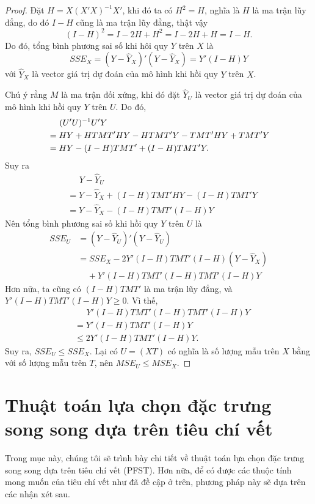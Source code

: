 \begin{proof}
	Đặt $H = X(X'X)^{-1}X'$, khi đó ta có $H^2 = H$, nghĩa là $H$ là ma trận lũy đẳng, do đó $I-H$ cũng là ma trận lũy đẳng, thật vậy
	\begin{equation*}
		(I-H)^2 = I - 2H + H^2 = I - 2H + H = I-H.
	\end{equation*}
	Do đó, tổng bình phương sai số khi hôi quy $Y$ trên $X$ là
	\begin{equation*}
		SSE_X = (Y-\hat{Y}_X)'(Y-\hat{Y}_X)
		= Y'(I-H)Y
	\end{equation*}
	với $\hat{Y}_X$ là vector giá trị dự đoán của mô hình khi hồi quy $Y$ trên $X$.
	
	Chú ý rằng $M$ là ma trận đối xứng, khi đó đặt $\hat{Y}_U$ là vector giá trị dự đoán của mô hình khi hồi quy $Y$ trên $U$. Do đó, 
	\begin{align*}
		\small
		&\;\;\;\;\;(U'U)^{-1}U'Y \\
		&= HY+HTMT'HY-HTMT'Y - TMT'HY+TMT'Y\\
		&= HY-(I-H)TMT'+(I-H)TMT'Y.
	\end{align*}
	Suy ra
	\begin{align*}
		&\;\;\;\;\;Y-\hat{Y}_U \\
		&= Y-\hat{Y}_X+(I-H)TMT'HY-(I-H)TMT'Y\\
		&= Y- \hat{Y}_X-(I-H)TMT'(I-H)Y
	\end{align*}
	Nên tổng bình phương sai số khi hồi quy $Y$ trên $U$ là
	\begin{align*}
		SSE_U &= (Y-\hat{Y}_U)'(Y-\hat{Y}_U)\\
		&= SSE_X-2Y'(I-H)TMT'(I-H)(Y-\hat{Y}_X)\\
		&\;\;\;\;+Y'(I-H)TMT'(I-H)TMT'(I-H)Y
	\end{align*}
	Hơn nữa, ta cũng có $(I-H)TMT'$ là ma trận lũy đẳng, và $Y'(I-H)TMT'(I-H)Y\ge 0$. Vì thế, 
	\begin{align*}
		&\;\;\;\;\;Y'(I-H)TMT'(I-H)TMT'(I-H)Y\\
		&=Y'(I-H)TMT'(I-H)Y\\
		&\le 2Y'(I-H)TMT'(I-H)Y.
	\end{align*}
	Suy ra, $SSE_U\le SSE_X$. Lại có $U = (X T)$ có nghĩa là số lượng mẫu trên $X$ bằng với số lượng mẫu trên $T$, nên $MSE_U\le MSE_X$.
\end{proof}

\section{Thuật toán lựa chọn đặc trưng song song dựa trên tiêu chí vết}\label{methods}
Trong mục này, chúng tôi sẽ trình bày chi tiết về thuật toán lựa chọn đặc trưng song song dựa trên tiêu chí vết (PFST). Hơn nữa, để có được các thuộc tính mong muốn của tiêu chí vết như đã đề cập ở trên, phương pháp này sẽ dựa trên các nhận xét sau.

